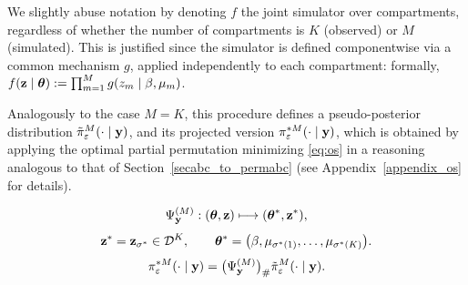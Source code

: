 We slightly abuse notation by denoting \( f \) the joint simulator over compartments, regardless of whether the number of compartments is \( K \) (observed) or \( M \) (simulated). This is justified since the simulator is defined componentwise via a common mechanism \( g \), applied independently to each compartment: formally, \( f(\mathbf{z} \mid \boldsymbol{\theta}) := \prod_{m=1}^M g(z_m \mid \beta, \mu_m) \).
 
Analogously to the case \( M = K \), this procedure defines a pseudo-posterior distribution \( \tilde{\pi}_\varepsilon^M(\cdot \mid \mathbf{y}) \), and its projected version \( \pi_\varepsilon^{*M}(\cdot \mid \mathbf{y}) \), which is obtained by applying the optimal partial permutation minimizing \eqref{eq:os} in a reasoning analogous to that of Section~\ref{secabc_to_permabc} (see Appendix~\ref{appendix_os} for details).

\begin{equation}
    \Psi_{\mathbf{y}}^{(M)} : (\boldsymbol{\theta},\mathbf{z}) \longmapsto (\boldsymbol{\theta}^*,\mathbf{z}^*),
\end{equation}
\begin{equation}
    \mathbf{z}^* = \mathbf{z}_{\sigma^*} \in \mathcal{D}^K,
    \qquad
    \boldsymbol{\theta}^* = \bigl(\beta,\mu_{\sigma^*(1)},\dots,\mu_{\sigma^*(K)}\bigr).
\end{equation}
\begin{equation}
    \pi_\varepsilon^{*M}(\cdot \mid \mathbf{y})
    =
    \bigl(\Psi_{\mathbf{y}}^{(M)}\bigr)_\#
    \tilde{\pi}_\varepsilon^M(\cdot \mid \mathbf{y}).
\end{equation}

